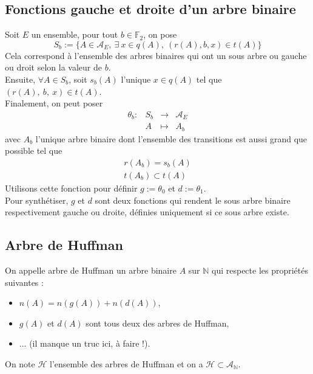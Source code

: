 \documentclass[a4paper, 12pt]{article}
\begin{document}
\subsection{Fonctions gauche et droite d'un arbre binaire}
Soit $E$ un ensemble, pour tout $b \in \mathbb{F}_2$, on pose
$$
S_b := \{A \in \mathcal{A}_E,\ \exists \ x \in q(A),\ (r(A), b, x) \in t(A)\}
$$
Cela correspond à l'ensemble des arbres binaires qui ont un sous arbre ou gauche ou droit selon la valeur de $b$. \\
Ensuite, $\forall A \in S_b$, soit $s_b(A)$ l'unique $x \in q(A)$ tel que $(r(A),\ b,\ x) \in t(A)$. \\
Finalement, on peut poser
$$
\begin{matrix}
\theta_b: &S_b &\rightarrow &\mathcal{A}_E \\
&A &\mapsto &A_b
\end{matrix}
$$
avec $A_b$ l'unique arbre binaire dont l'ensemble des transitions est aussi grand que possible tel que
\begin{gather}
r(A_b) = s_b(A) \\
t(A_b) \subset t(A)
\end{gather}
Utilisons cette fonction pour définir $g := \theta_0$ et $d := \theta_1$. \\
Pour synthétiser, $g$ et $d$ sont deux fonctions qui rendent le sous arbre binaire respectivement gauche ou droite, définies uniquement si ce sous arbre existe. \\

\subsection{Arbre de Huffman}
On appelle arbre de Huffman un arbre binaire $A$ sur $\mathbb{N}$ qui respecte les propriétés suivantes :
\begin{itemize}
\item $n(A) = n(g(A))+n(d(A))$,
\item $g(A)$ et $d(A)$ sont tous deux des arbres de Huffman,
\item ... (il manque un truc ici, à faire !).
\end{itemize}
On note $\mathcal{H}$ l'ensemble des arbres de Huffman et on a $\mathcal{H} \subset \mathcal{A}_\mathbb{N}$.
\end{document}
